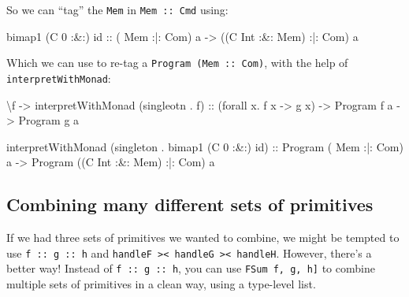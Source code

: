 \documentclass[]{article}
\newenvironment{Shaded}{}{}
\newcommand{\DataTypeTok}[1]{\textcolor[rgb]{0.56,0.13,0.00}{#1}}
\newcommand{\DecValTok}[1]{\textcolor[rgb]{0.25,0.63,0.44}{#1}}
\newcommand{\FunctionTok}[1]{\textcolor[rgb]{0.02,0.16,0.49}{#1}}
\newcommand{\NormalTok}[1]{#1}
\newcommand{\OtherTok}[1]{\textcolor[rgb]{0.00,0.44,0.13}{#1}}
\begin{document}
So we can ``tag'' the \texttt{Mem} in \texttt{Mem\ :\textbar{}:\ Cmd} using:

\begin{Shaded}
\begin{Highlighting}[]
\NormalTok{bimap1 (}\DataTypeTok{C} \DecValTok{0} \FunctionTok{:&:}\NormalTok{) id}
\OtherTok{    ::}\NormalTok{ (      }\DataTypeTok{Mem}       \FunctionTok{:|:} \DataTypeTok{Com}\NormalTok{) a}
    \OtherTok{->}\NormalTok{ ((}\DataTypeTok{C} \DataTypeTok{Int} \FunctionTok{:&:} \DataTypeTok{Mem}\NormalTok{) }\FunctionTok{:|:} \DataTypeTok{Com}\NormalTok{) a}
\end{Highlighting}
\end{Shaded}

Which we can use to re-tag a \texttt{Program\ (Mem\ :\textbar{}:\ Com)}, with
the help of \texttt{interpretWithMonad}:

\begin{Shaded}
\begin{Highlighting}[]
\NormalTok{\textbackslash{}f }\OtherTok{->}\NormalTok{ interpretWithMonad (singleotn }\FunctionTok{.}\NormalTok{ f)}
\OtherTok{    ::}\NormalTok{ (forall x}\FunctionTok{.}\NormalTok{ f x }\OtherTok{->}\NormalTok{ g x)}
    \OtherTok{->} \DataTypeTok{Program}\NormalTok{ f a}
    \OtherTok{->} \DataTypeTok{Program}\NormalTok{ g a}

\NormalTok{interpretWithMonad (singleton }\FunctionTok{.}\NormalTok{ bimap1 (}\DataTypeTok{C} \DecValTok{0} \FunctionTok{:&:}\NormalTok{) id)}
\OtherTok{    ::} \DataTypeTok{Program}\NormalTok{ (      }\DataTypeTok{Mem}       \FunctionTok{:|:} \DataTypeTok{Com}\NormalTok{) a}
    \OtherTok{->} \DataTypeTok{Program}\NormalTok{ ((}\DataTypeTok{C} \DataTypeTok{Int} \FunctionTok{:&:} \DataTypeTok{Mem}\NormalTok{) }\FunctionTok{:|:} \DataTypeTok{Com}\NormalTok{) a}
\end{Highlighting}
\end{Shaded}

\hypertarget{combining-many-different-sets-of-primitives}{%
\subsection{Combining many different sets of
primitives}\label{combining-many-different-sets-of-primitives}}

If we had three sets of primitives we wanted to combine, we might be tempted to
use \texttt{f\ :\textbar{}:\ g\ :\textbar{}:\ h} and
\texttt{handleF\ \textgreater{}\textbar{}\textless{}\ handleG\ \textgreater{}\textbar{}\textless{}\ handleH}.
However, there's a better way! Instead of
\texttt{f\ :\textbar{}:\ g\ :\textbar{}:\ h}, you can use
\texttt{FSum\ \textquotesingle{}{[}f,\ g,\ h{]}} to combine multiple sets of
primitives in a clean way, using a type-level list.
\end{document}
